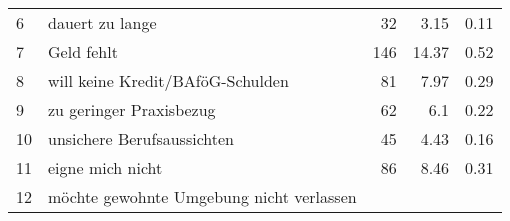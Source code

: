 \begin{longtable}{lXrrr}
     6 &
     \multicolumn{1}{X}{ dauert zu lange   } &


       \num{32} &
       \num[round-mode=places,round-precision=2]{3,15} &
         \num[round-mode=places,round-precision=2]{0,11} \\

     7 &
     \multicolumn{1}{X}{ Geld fehlt   } &


       \num{146} &
       \num[round-mode=places,round-precision=2]{14,37} &
         \num[round-mode=places,round-precision=2]{0,52} \\

     8 &
     \multicolumn{1}{X}{ will keine Kredit/BAföG-Schulden   } &


       \num{81} &
       \num[round-mode=places,round-precision=2]{7,97} &
         \num[round-mode=places,round-precision=2]{0,29} \\

     9 &
     \multicolumn{1}{X}{ zu geringer Praxisbezug   } &


       \num{62} &
       \num[round-mode=places,round-precision=2]{6,1} &
         \num[round-mode=places,round-precision=2]{0,22} \\

     10 &
     \multicolumn{1}{X}{ unsichere Berufsaussichten   } &


       \num{45} &
       \num[round-mode=places,round-precision=2]{4,43} &
         \num[round-mode=places,round-precision=2]{0,16} \\

     11 &
     \multicolumn{1}{X}{ eigne mich nicht   } &


       \num{86} &
       \num[round-mode=places,round-precision=2]{8,46} &
         \num[round-mode=places,round-precision=2]{0,31} \\

     12 &
     \multicolumn{1}{X}{ möchte gewohnte Umgebung nicht verlassen   } &



\end{longtable}
